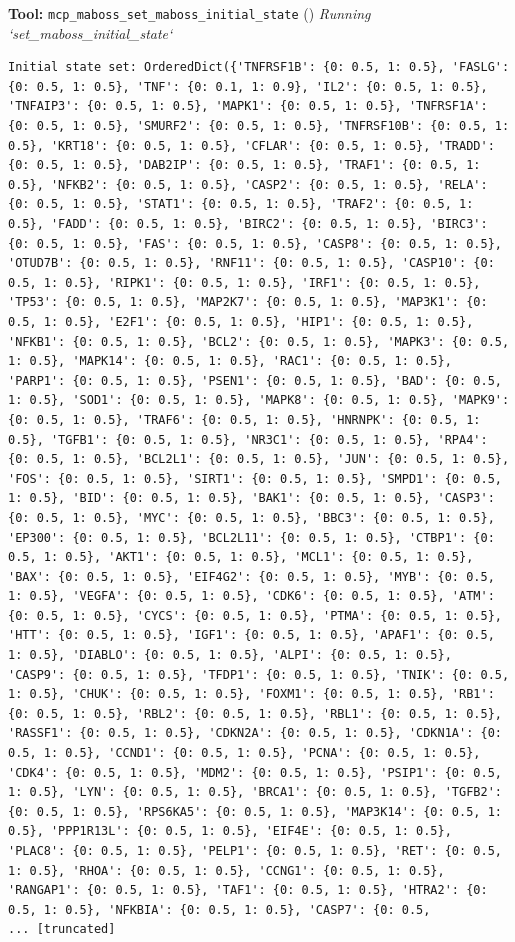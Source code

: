 \documentclass[11pt,a4paper]{article}
\begin{document}
\begin{toolokbox}
\textbf{Tool:} \texttt{mcp\_maboss\_set\_maboss\_initial\_state} (\checkmark)
\textit{Running `set\_maboss\_initial\_state`}
\begin{lstlisting}
Initial state set: OrderedDict({'TNFRSF1B': {0: 0.5, 1: 0.5}, 'FASLG': {0: 0.5, 1: 0.5}, 'TNF': {0: 0.1, 1: 0.9}, 'IL2': {0: 0.5, 1: 0.5}, 'TNFAIP3': {0: 0.5, 1: 0.5}, 'MAPK1': {0: 0.5, 1: 0.5}, 'TNFRSF1A': {0: 0.5, 1: 0.5}, 'SMURF2': {0: 0.5, 1: 0.5}, 'TNFRSF10B': {0: 0.5, 1: 0.5}, 'KRT18': {0: 0.5, 1: 0.5}, 'CFLAR': {0: 0.5, 1: 0.5}, 'TRADD': {0: 0.5, 1: 0.5}, 'DAB2IP': {0: 0.5, 1: 0.5}, 'TRAF1': {0: 0.5, 1: 0.5}, 'NFKB2': {0: 0.5, 1: 0.5}, 'CASP2': {0: 0.5, 1: 0.5}, 'RELA': {0: 0.5, 1: 0.5}, 'STAT1': {0: 0.5, 1: 0.5}, 'TRAF2': {0: 0.5, 1: 0.5}, 'FADD': {0: 0.5, 1: 0.5}, 'BIRC2': {0: 0.5, 1: 0.5}, 'BIRC3': {0: 0.5, 1: 0.5}, 'FAS': {0: 0.5, 1: 0.5}, 'CASP8': {0: 0.5, 1: 0.5}, 'OTUD7B': {0: 0.5, 1: 0.5}, 'RNF11': {0: 0.5, 1: 0.5}, 'CASP10': {0: 0.5, 1: 0.5}, 'RIPK1': {0: 0.5, 1: 0.5}, 'IRF1': {0: 0.5, 1: 0.5}, 'TP53': {0: 0.5, 1: 0.5}, 'MAP2K7': {0: 0.5, 1: 0.5}, 'MAP3K1': {0: 0.5, 1: 0.5}, 'E2F1': {0: 0.5, 1: 0.5}, 'HIP1': {0: 0.5, 1: 0.5}, 'NFKB1': {0: 0.5, 1: 0.5}, 'BCL2': {0: 0.5, 1: 0.5}, 'MAPK3': {0: 0.5, 1: 0.5}, 'MAPK14': {0: 0.5, 1: 0.5}, 'RAC1': {0: 0.5, 1: 0.5}, 'PARP1': {0: 0.5, 1: 0.5}, 'PSEN1': {0: 0.5, 1: 0.5}, 'BAD': {0: 0.5, 1: 0.5}, 'SOD1': {0: 0.5, 1: 0.5}, 'MAPK8': {0: 0.5, 1: 0.5}, 'MAPK9': {0: 0.5, 1: 0.5}, 'TRAF6': {0: 0.5, 1: 0.5}, 'HNRNPK': {0: 0.5, 1: 0.5}, 'TGFB1': {0: 0.5, 1: 0.5}, 'NR3C1': {0: 0.5, 1: 0.5}, 'RPA4': {0: 0.5, 1: 0.5}, 'BCL2L1': {0: 0.5, 1: 0.5}, 'JUN': {0: 0.5, 1: 0.5}, 'FOS': {0: 0.5, 1: 0.5}, 'SIRT1': {0: 0.5, 1: 0.5}, 'SMPD1': {0: 0.5, 1: 0.5}, 'BID': {0: 0.5, 1: 0.5}, 'BAK1': {0: 0.5, 1: 0.5}, 'CASP3': {0: 0.5, 1: 0.5}, 'MYC': {0: 0.5, 1: 0.5}, 'BBC3': {0: 0.5, 1: 0.5}, 'EP300': {0: 0.5, 1: 0.5}, 'BCL2L11': {0: 0.5, 1: 0.5}, 'CTBP1': {0: 0.5, 1: 0.5}, 'AKT1': {0: 0.5, 1: 0.5}, 'MCL1': {0: 0.5, 1: 0.5}, 'BAX': {0: 0.5, 1: 0.5}, 'EIF4G2': {0: 0.5, 1: 0.5}, 'MYB': {0: 0.5, 1: 0.5}, 'VEGFA': {0: 0.5, 1: 0.5}, 'CDK6': {0: 0.5, 1: 0.5}, 'ATM': {0: 0.5, 1: 0.5}, 'CYCS': {0: 0.5, 1: 0.5}, 'PTMA': {0: 0.5, 1: 0.5}, 'HTT': {0: 0.5, 1: 0.5}, 'IGF1': {0: 0.5, 1: 0.5}, 'APAF1': {0: 0.5, 1: 0.5}, 'DIABLO': {0: 0.5, 1: 0.5}, 'ALPI': {0: 0.5, 1: 0.5}, 'CASP9': {0: 0.5, 1: 0.5}, 'TFDP1': {0: 0.5, 1: 0.5}, 'TNIK': {0: 0.5, 1: 0.5}, 'CHUK': {0: 0.5, 1: 0.5}, 'FOXM1': {0: 0.5, 1: 0.5}, 'RB1': {0: 0.5, 1: 0.5}, 'RBL2': {0: 0.5, 1: 0.5}, 'RBL1': {0: 0.5, 1: 0.5}, 'RASSF1': {0: 0.5, 1: 0.5}, 'CDKN2A': {0: 0.5, 1: 0.5}, 'CDKN1A': {0: 0.5, 1: 0.5}, 'CCND1': {0: 0.5, 1: 0.5}, 'PCNA': {0: 0.5, 1: 0.5}, 'CDK4': {0: 0.5, 1: 0.5}, 'MDM2': {0: 0.5, 1: 0.5}, 'PSIP1': {0: 0.5, 1: 0.5}, 'LYN': {0: 0.5, 1: 0.5}, 'BRCA1': {0: 0.5, 1: 0.5}, 'TGFB2': {0: 0.5, 1: 0.5}, 'RPS6KA5': {0: 0.5, 1: 0.5}, 'MAP3K14': {0: 0.5, 1: 0.5}, 'PPP1R13L': {0: 0.5, 1: 0.5}, 'EIF4E': {0: 0.5, 1: 0.5}, 'PLAC8': {0: 0.5, 1: 0.5}, 'PELP1': {0: 0.5, 1: 0.5}, 'RET': {0: 0.5, 1: 0.5}, 'RHOA': {0: 0.5, 1: 0.5}, 'CCNG1': {0: 0.5, 1: 0.5}, 'RANGAP1': {0: 0.5, 1: 0.5}, 'TAF1': {0: 0.5, 1: 0.5}, 'HTRA2': {0: 0.5, 1: 0.5}, 'NFKBIA': {0: 0.5, 1: 0.5}, 'CASP7': {0: 0.5, 
... [truncated]
\end{lstlisting}
\end{toolokbox}
\end{document}
